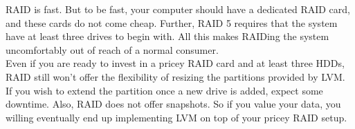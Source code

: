 RAID is fast. But to be fast, your computer should have a dedicated RAID card,
and these cards do not come cheap. Further, RAID 5 requires that the system have
at least three drives to begin with. All this makes RAIDing the system
uncomfortably out of reach of a normal consumer.\\

Even if you are ready to invest in a pricey RAID card and at least three HDDs,
RAID still won't offer the flexibility of resizing the partitions provided by
LVM. If you wish to extend the partition once a new drive is added, expect some
downtime. Also, RAID does not offer snapshots. So if you value your data, you
willing eventually end up implementing LVM on top of your pricey RAID setup.
